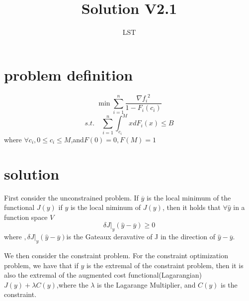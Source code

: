 \documentclass{article}
\begin{document}
\title{Solution V2.1}
\author{LST}
\maketitle
\section{problem definition}


\[\min \sum_{i=1}^n \frac{{\nabla f_i}^2}{1-F_i(c_i)}\]
\[s.t. \quad \sum_{i=1}^n\int_{c_i}^MxdF_i(x)\leq B\]
where $\forall c_i,0\leq c_i\leq M$,and$F(0)=0,F(M)=1$
\section{solution}


First consider the unconstrained problem. If $\overline{y}$ is the local minimum of the functional $J(y)$
if $y$ is the local niminum of $J(y)$, then it holds that $\forall \hat{y}$ in a function space $V$
\[\delta J|_y(\hat{y}-\overline{y})\geq 0\]
where $,\delta J|_y(\hat{y}-\overline{y})$is the Gateaux deravative of J in the direction of $\hat{y}-\overline{y}$. 

We then consider the constraint problem. For the constraint optimization problem, we have that if $y$ is the extremal of the constraint problem, then it is also the extremal of the augmented cost functional(Lagarangian) $J(y)+\lambda C(y)$,where the $\lambda$ is the Lagarange Multiplier, and $C(y)$ is the constraint.
\end{document}
